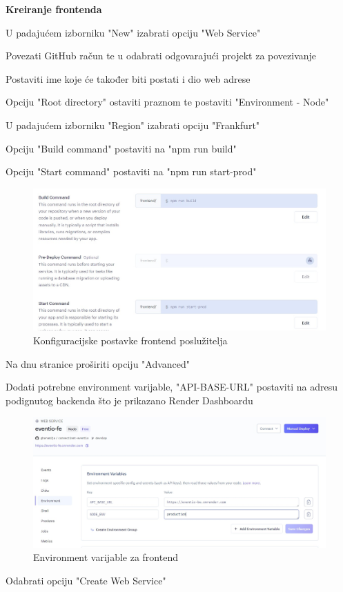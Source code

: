 			\textbf{Kreiranje frontenda}
			
			\begin{packed_enum}
				
				\item  U padajućem izborniku "New" izabrati opciju "Web Service"
				\item	Povezati GitHub račun te u odabrati odgovarajući projekt za povezivanje
				\item	Postaviti ime koje će također biti postati i dio web adrese
				\item	Opciju "Root directory" ostaviti praznom te postaviti "Environment - Node"
				\item 	U padajućem izborniku "Region" izabrati opciju "Frankfurt"
				\item 	Opciju "Build command" postaviti na "npm run build"
				\item 	Opciju "Start command" postaviti na "npm run start-prod"
				
				\begin{figure}[H]
					\includegraphics[scale=0.4]{deploy/frontendConf.jpeg}
					\centering
					\caption{Konfiguracijske postavke frontend poslužitelja}
					\label{fig:promjene}
				\end{figure}
				
				\item 	Na dnu stranice proširiti opciju "Advanced"
				\item 	Dodati potrebne environment varijable, "API-BASE-URL" postaviti na adresu podignutog backenda što je prikazano Render Dashboardu
				
				\begin{figure}[H]
					\includegraphics[scale=0.25]{deploy/frontendEnv.jpeg}
					\centering
					\caption{Environment varijable za frontend}
					\label{fig:promjene}
				\end{figure}
				
				\item 	Odabrati opciju "Create Web Service"
				
				
			\end{packed_enum}
			
			
			\eject 